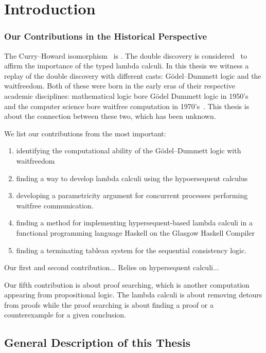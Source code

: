 \chapter{Introduction}

\subsection{Our Contributions in the Historical Perspective}

The Curry--Howard isomorphism~\citep{curryhoward} is .
The double discovery is considered~\citep{wadler2012propositions}
to affirm the importance of the typed lambda calculi.
In this thesis we witness a replay of the double discovery with
different casts: G\"odel--Dummett logic and the waitfreedom.
Both of these were born in the early eras of their respective academic
disciplines:
mathematical logic bore G\"odel Dummett logic in
1950's~\citep{dummett59}
and the
computer science bore waitfree computation in
1970's~\citep{lamport1979make}.
This thesis is about the connection between these two,
which has been unknown.

We list our contributions from the most important:
\begin{enumerate}
 \item identifying the computational ability of the
G\"odel--Dummett logic with waitfreedom
 \item finding a way to develop lambda calculi using
       the hypoersequent calculus
 \item developing a parametricity argument for
       concurrent processes performing waitfree communication.
 \item finding a method for implementing hypersequent-based lambda calculi in a
       functional programming language Haskell on the Glasgow Haskell
       Compiler
 \item finding a terminating tableau system for the sequential
       consistency logic.
\end{enumerate}

Our first and second contribution... 
Relies on hypersequent calculi... 

Our fifth contribution is about proof searching, which is another
computation appearing from propositional logic.
The lambda calculi is about removing detours from proofs while the proof
searching is about finding a proof or a counterexample for a given
conclusion.

\section{General Description of this Thesis}

